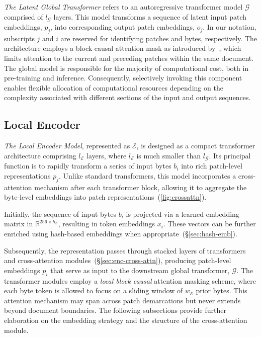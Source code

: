 \textit{The Latent Global Transformer} refers to an autoregressive transformer model $\mathcal{G}$ comprised of $l_{\mathcal{G}}$ layers. This model transforms a sequence of latent input patch embeddings, $p_j$, into corresponding output patch embeddings, $o_j$. In our notation, subscripts $j$ and $i$ are reserved for identifying patches and bytes, respectively. The architecture employs a block-causal attention mask as introduced by~\citep{dubey2024llama}, which limits attention to the current and preceding patches within the same document. The global model is responsible for the majority of computational cost, both in pre-training and inference. Consequently, selectively invoking this component enables flexible allocation of computational resources depending on the complexity associated with different sections of the input and output sequences.

\subsection{Local Encoder}
\label{section:local}

\textit{The Local Encoder Model}, represented as $\mathcal{E}$, is designed as a compact transformer architecture comprising $l_{\mathcal{E}}$ layers, where $l_{\mathcal{E}}$ is much smaller than $l_{\mathcal{G}}$. Its principal function is to rapidly transform a series of input bytes $b_i$ into rich patch-level representations $p_j$. Unlike standard transformers, this model incorporates a cross-attention mechanism after each transformer block, allowing it to aggregate the byte-level embeddings into patch representations~(\autoref{fig:crossattn}). 

Initially, the sequence of input bytes $b_i$ is projected via a learned embedding matrix in $\mathbb{R}^{256 \times h_{\mathcal{E}}}$, resulting in token embeddings $x_i$. These vectors can be further enriched using hash-based embeddings when appropriate~(\S\ref{sec:hash-emb}). 

Subsequently, the representation passes through stacked layers of transformers and cross-attention modules~(\S\ref{sec:enc-cross-attn}), producing patch-level embeddings $p_i$ that serve as input to the downstream global transformer, $\mathcal{G}$. The transformer modules employ a \textit{local block causal} attention masking scheme, where each byte token is allowed to focus on a sliding window of $w_{\mathcal{E}}$ prior bytes. This attention mechanism may span across patch demarcations but never extends beyond document boundaries. The following subsections provide further elaboration on the embedding strategy and the structure of the cross-attention module.

